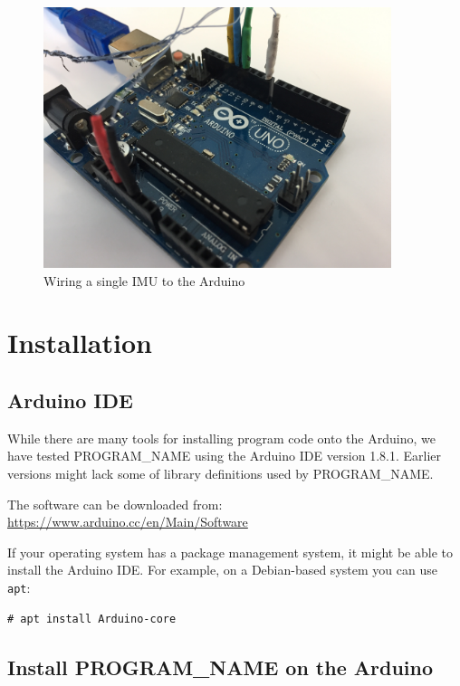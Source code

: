 \documentclass[11pt,letterpaper,article,oneside]{memoir}
\newcommand{\name}{PROGRAM\_NAME}
\begin{document}
\begin{figure}[]
    \begin{center}
        \includegraphics[height=3in]{wiring}
    \end{center}
    \label{fig:wiring}
    \caption{Wiring a single IMU to the Arduino}
\end{figure}




\chapter{Installation}

\section{Arduino IDE}
While there are many tools for installing program code onto the Arduino, we have
tested \name{} using the Arduino IDE version 1.8.1.
Earlier versions might lack some of library definitions used by \name{}.

The software can be downloaded from:
\url{https://www.arduino.cc/en/Main/Software}

If your operating system has a package management system, it might be able
to install the Arduino IDE. For example, on a Debian-based system you can use
\texttt{apt}:
\begin{verbatim}
# apt install Arduino-core
\end{verbatim}

\section{Install \name{} on the Arduino}
\label{sec:installarduinocode}
\end{document}
